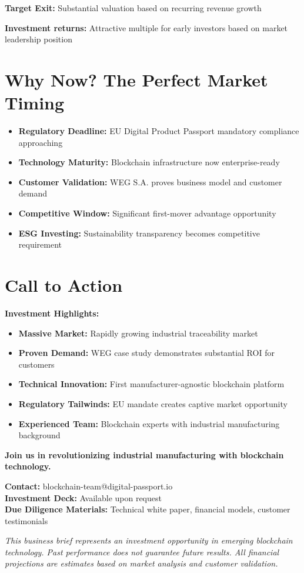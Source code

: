 \documentclass[11pt,a4paper]{article}
\begin{document}
\textbf{Target Exit:} Substantial valuation based on recurring revenue growth

\textbf{Investment returns:} Attractive multiple for early investors based on market leadership position

\section{Why Now? The Perfect Market Timing}

\begin{itemize}[leftmargin=0.5cm]
    \item \textbf{Regulatory Deadline:} EU Digital Product Passport mandatory compliance approaching
    \item \textbf{Technology Maturity:} Blockchain infrastructure now enterprise-ready
    \item \textbf{Customer Validation:} WEG S.A. proves business model and customer demand
    \item \textbf{Competitive Window:} Significant first-mover advantage opportunity
    \item \textbf{ESG Investing:} Sustainability transparency becomes competitive requirement
\end{itemize}

\section{Call to Action}

\textbf{Investment Highlights:}
\begin{itemize}[leftmargin=0.5cm]
    \item \textbf{Massive Market:} Rapidly growing industrial traceability market
    \item \textbf{Proven Demand:} WEG case study demonstrates substantial ROI for customers
    \item \textbf{Technical Innovation:} First manufacturer-agnostic blockchain platform
    \item \textbf{Regulatory Tailwinds:} EU mandate creates captive market opportunity
    \item \textbf{Experienced Team:} Blockchain experts with industrial manufacturing background
\end{itemize}

\textbf{Join us in revolutionizing industrial manufacturing with blockchain technology.}

\textbf{Contact:} blockchain-team@digital-passport.io \\
\textbf{Investment Deck:} Available upon request \\
\textbf{Due Diligence Materials:} Technical white paper, financial models, customer testimonials

\vspace{0.2cm}
\textit{This business brief represents an investment opportunity in emerging blockchain technology. Past performance does not guarantee future results. All financial projections are estimates based on market analysis and customer validation.}
\end{document}
